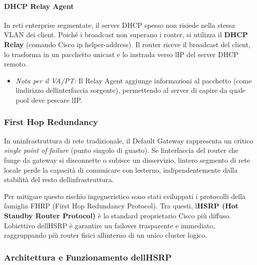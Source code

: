 \documentclass[11pt,a4paper]{article}
\providecommand{\tightlist}{%
  \setlength{\itemsep}{0pt}\setlength{\parskip}{0pt}}
\begin{document}
\paragraph{DHCP Relay Agent}\label{dhcp-relay-agent}

In reti enterprise segmentate, il server DHCP spesso non risiede nella
stessa VLAN dei client. Poiché i broadcast non superano i router, si
utilizza il \textbf{DHCP Relay} (comando Cisco ip helper-address). Il
router riceve il broadcast del client, lo trasforma in un pacchetto
unicast e lo instrada verso l\textquotesingle IP del server DHCP remoto.

\begin{itemize}
\tightlist
\item
  \emph{Nota per il VA/PT:} Il Relay Agent aggiunge informazioni al
  pacchetto (come l\textquotesingle indirizzo
  dell\textquotesingle interfaccia sorgente), permettendo al server di
  capire da quale pool deve pescare l\textquotesingle IP.
\end{itemize}

\subsubsection{First Hop Redundancy}\label{first-hop-redundancy}

In un\textquotesingle infrastruttura di rete tradizionale, il Default
Gateway rappresenta un critico \emph{single point of failure} (punto
singolo di guasto). Se l\textquotesingle interfaccia del router che
funge da gateway si disconnette o subisce un disservizio,
l\textquotesingle intero segmento di rete locale perde la capacità di
comunicare con l\textquotesingle esterno, indipendentemente dalla
stabilità del resto dell\textquotesingle infrastruttura.

Per mitigare questo rischio ingegneristico sono stati sviluppati i
protocolli della famiglia FHRP (First Hop Redundancy Protocol). Tra
questi, l\textquotesingle{}\textbf{HSRP (Hot Standby Router Protocol)} è
lo standard proprietario Cisco più diffuso. L\textquotesingle obiettivo
dell\textquotesingle HSRP è garantire un failover trasparente e
immediato, raggruppando più router fisici all\textquotesingle interno di
un unico cluster logico.

\subsubsection{Architettura e Funzionamento
dell\textquotesingle HSRP}\label{architettura-e-funzionamento-dellhsrp}
\end{document}
